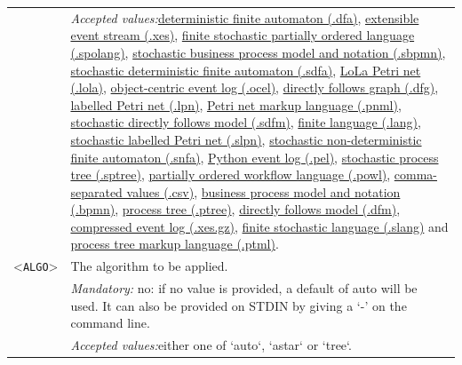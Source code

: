 {\begin{tabularx}{\linewidth}{lX}
&\textit{Accepted values:}\quad \hyperref[filehandler:deterministic finite automaton]{deterministic finite automaton (.dfa)}, \hyperref[filehandler:extensible event stream]{extensible event stream (.xes)}, \hyperref[filehandler:finite stochastic partially ordered language]{finite stochastic partially ordered language (.spolang)}, \hyperref[filehandler:stochastic business process model and notation]{stochastic business process model and notation (.sbpmn)}, \hyperref[filehandler:stochastic deterministic finite automaton]{stochastic deterministic finite automaton (.sdfa)}, \hyperref[filehandler:LoLa Petri net]{LoLa Petri net (.lola)}, \hyperref[filehandler:object-centric event log]{object-centric event log (.ocel)}, \hyperref[filehandler:directly follows graph]{directly follows graph (.dfg)}, \hyperref[filehandler:labelled Petri net]{labelled Petri net (.lpn)}, \hyperref[filehandler:Petri net markup language]{Petri net markup language (.pnml)}, \hyperref[filehandler:stochastic directly follows model]{stochastic directly follows model (.sdfm)}, \hyperref[filehandler:finite language]{finite language (.lang)}, \hyperref[filehandler:stochastic labelled Petri net]{stochastic labelled Petri net (.slpn)}, \hyperref[filehandler:stochastic non-deterministic finite automaton]{stochastic non-deterministic finite automaton (.snfa)}, \hyperref[filehandler:Python event log]{Python event log (.pel)}, \hyperref[filehandler:stochastic process tree]{stochastic process tree (.sptree)}, \hyperref[filehandler:partially ordered workflow language]{partially ordered workflow language (.powl)}, \hyperref[filehandler:comma-separated values]{comma-separated values (.csv)}, \hyperref[filehandler:business process model and notation]{business process model and notation (.bpmn)}, \hyperref[filehandler:process tree]{process tree (.ptree)}, \hyperref[filehandler:directly follows model]{directly follows model (.dfm)}, \hyperref[filehandler:compressed event log]{compressed event log (.xes.gz)}, \hyperref[filehandler:finite stochastic language]{finite stochastic language (.slang)} and \hyperref[filehandler:process tree markup language]{process tree markup language (.ptml)}.\\
<\texttt{ALGO}>&The algorithm to be applied.\\
&\textit{Mandatory:} \quad no: if no value is provided, a default of auto will be used. It can also be provided on STDIN by giving a `-' on the command line.\\
&\textit{Accepted values:}\quad either one of `auto`, `astar` or `tree`.\\

\end{tabularx}}
